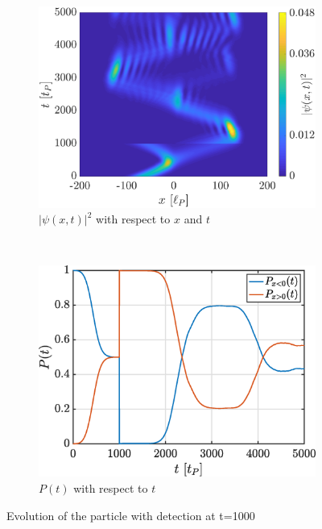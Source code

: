 \documentclass[a4paper,12pt,twoside]{article}
\begin{document}
\begin{figure}[h]
        \centering
        \begin{subfigure}[t]{0.45\textwidth}
          \includegraphics[width=\textwidth]{graphs/iv_det_Evo.eps}
          \caption{$|\psi(x, t)|^2$ with respect to $x$ and $t$}
          \label{fig:iv_det_Evo}
        \end{subfigure}
        ~
        \begin{subfigure}[t]{0.45\textwidth}
          \includegraphics[width=\textwidth]{graphs/iv_det_Prob.eps}
          \caption{$P(t)$ with respect to $t$}
          \label{fig:iv_det_Prob}
        \end{subfigure}
        \caption{Evolution of the particle with detection at t=1000}
        \label{fig:iv_det}
\end{figure}
\end{document}
